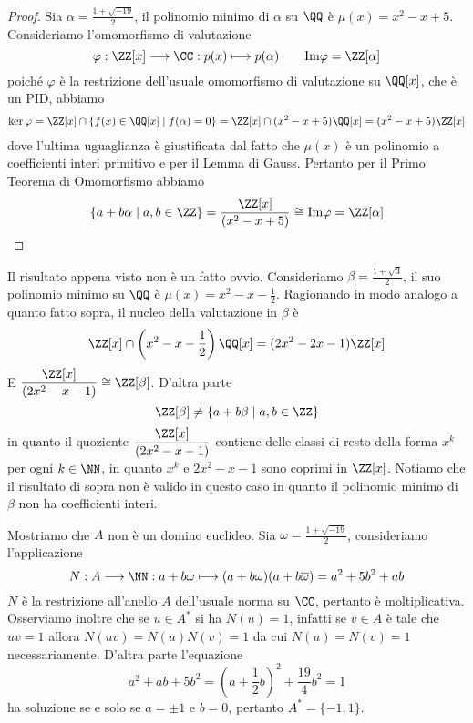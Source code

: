\documentclass[11pt]{scrartcl}
\begin{document}
\begin{proof}
    Sia $\alpha = \displaystyle\frac{1 + \sqrt{-19}}{2}$, il polinomio minimo di $\alpha$
    su $\QQ$ è $\mu(x) = x^2 - x + 5$. Consideriamo l'omomorfismo di valutazione
    \[
        \varphi: \ZZ[x]\longrightarrow \CC: p(x) \longmapsto p(\alpha) 
        \qquad \mathrm{Im\varphi} = \ZZ[\alpha]
    \]
    poiché $\varphi$ è la restrizione dell'usuale omomorfismo di valutazione
    su $\QQ[x]$, che è un PID, abbiamo
    \begin{multline*}
        \ker \varphi = \ZZ[x] \cap \{f(x) \in \QQ[x]\mid f(\alpha) = 0\}
        = \ZZ[x] \cap (x^2 - x + 5)\QQ[x] = (x^2 - x + 5)\ZZ[x]
    \end{multline*}
    dove l'ultima uguaglianza è giustificata dal fatto che $\mu(x)$ è un 
    polinomio a coefficienti interi primitivo e per il Lemma di Gauss.
    Pertanto per il Primo Teorema di Omomorfismo abbiamo 
    \[
        \{a + b\alpha \mid a, b \in \ZZ\} = \frac{\ZZ[x]}{(x^2 - x + 5)} \cong \mathrm{Im\varphi} = 
         \ZZ[\alpha]
    \]
\end{proof}

\begin{remark}
    Il risultato appena visto non è un fatto ovvio. Consideriamo $\beta = 
    \displaystyle\frac{1 + \sqrt{3}}{2}$,
    il suo polinomio minimo su $\QQ$ è $\displaystyle\mu(x) = x^2 - x - \frac 1 2$.
    Ragionando in modo analogo a quanto fatto sopra, il nucleo della valutazione
    in $\beta$ è 
    \[
        \ZZ[x] \cap \left(x^2 - x - \frac 1 2\right)\QQ[x] =(2x^2 - 2x - 1)\ZZ[x]
    \]
    E $\displaystyle\frac{\ZZ[x]}{(2x^2 - x - 1)} \cong \ZZ[\beta]$.
    D'altra parte 
    \[
        \ZZ[\beta] \neq \{a + b\beta\mid a, b \in \ZZ\}
    \]
    in quanto il quoziente $\displaystyle\frac{\ZZ[x]}{(2x^2 - x - 1)}$
    contiene delle classi di resto della forma $\overline{x^k}$ per ogni $k \in \NN$,
    in quanto $x^k$ e $2x^2 - x - 1$ sono coprimi in $\ZZ[x]$. Notiamo che
    il risultato di sopra non è valido in questo caso in quanto il polinomio
    minimo di $\beta$ non ha coefficienti interi.
\end{remark}

Mostriamo che $A$ non è un domino euclideo. Sia $\omega = 
\displaystyle\frac{1 + \sqrt{-19}}{2}$, consideriamo l'applicazione
\[
    N: A \longrightarrow \NN: a + b\omega \longmapsto (a + b\omega)(a + b\overline{\omega}) =
    a^2 + 5b^2 + ab
\]
$N$ è la restrizione all'anello $A$ dell'usuale norma su $\CC$,
pertanto è moltiplicativa. Osserviamo inoltre che se $u \in A^*$ si ha 
$N(u)= 1$, infatti se $v \in A$ è tale che $uv = 1$ allora $N(uv) = N(u)N(v) = 1$
da cui $N(u) = N(v) = 1$ necessariamente. D'altra parte l'equazione 
\[
    a^2 + ab + 5b^2 = \left(a + \frac 1 2 b\right)^2 + \frac{19}{4} b^2 = 1
\]
ha soluzione se e solo se $a = \pm 1$ e $b = 0$, pertanto $A^* = \{-1, 1\}$.
\end{document}
